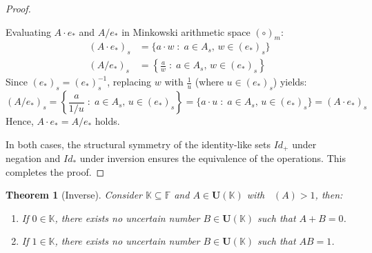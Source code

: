 \documentclass[a4paper,12pt,twoside]{memoir}
\newtheorem{theorem}{Theorem}[chapter]
\DeclareMathOperator{\dimU}{\dim_U}
\newcommand{\tsbd}[1]{\mathbf{U}(\mathbb{#1})}
\begin{document}
\begin{proof}
\begin{enumerate}[leftmargin=*]
			Evaluating $A \cdot e_*$ and $A / e_*$ in Minkowski arithmetic space $(\circ)_m$:
			\begin{align*}
				(A \cdot e_*)_s & = \{a \cdot w \;:\; a \in A_s, \, w \in (e_*)_s\}                 \\
				(A / e_*)_s     & = \left\{ \frac{a}{w} \;:\; a \in A_s, \, w \in (e_*)_s \right\}
			\end{align*}
			Since $(e_*)_s = (e_*)_s^{-1}$, replacing $w$ with $\frac{1}{u}$ (where $u \in (e_*)_s$) yields:
			\[
			(A / e_*)_s = \left\{ \frac{a}{1/u} \;:\; a \in A_s, \, u \in (e_*)_s \right\} = \{a \cdot u \;:\; a \in A_s, \, u \in (e_*)_s\} = (A \cdot e_*)_s
			\]
			Hence, $A \cdot e_* = A / e_*$ holds.
		\end{enumerate}
		In both cases, the structural symmetry of the identity-like sets $Id_+$ under negation and $Id_*$ under inversion ensures the equivalence of the operations. This completes the proof.
	\end{proof}
	\begin{theorem}[Inverse]
		Consider $\mathbb{K} \subseteq \mathbb{F}$ and $A \in \tsbd{K}$ with $\dimU(A) > 1$, then:
		\begin{enumerate}[leftmargin=*]
			\item If $0 \in \mathbb{K}$, there exists no uncertain number $B \in \tsbd{K}$ such that $A+B = 0$.
			\item If $1 \in \mathbb{K}$, there exists no uncertain number $B \in \tsbd{K}$ such that $AB = 1$.
		\end{enumerate}
	\end{theorem}
\end{document}
